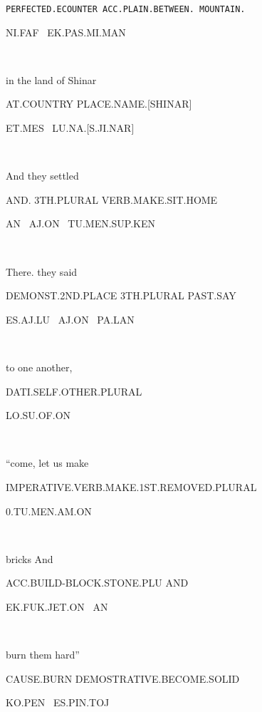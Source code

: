 {{{\tt PERFECTED.ECOUNTER  	ACC.PLAIN.BETWEEN. MOUNTAIN.	}

NI.FAF~                                EK.PAS.MI.MAN 

\Atlanni\faf~\ek\pas\mi\man


\drie  

in the land          of Shinar 

AT.COUNTRY	PLACE.NAME.[SHINAR] 

ET.MES~		LU.NA.[S.JI.NAR] 

\et\mes~\lu\na{}\

\drie


And 	they 		settled			 

AND.	3TH.PLURAL	VERB.MAKE.SIT.HOME	 

AN~	AJ.ON~   TU.MEN.SUP.KEN 

\an~\aj\on~\tu\men\Atlansup\ken

\drie
  

There.			they		said 	 

DEMONST.2ND.PLACE	3TH.PLURAL	PAST.SAY 

ES.AJ.LU~		AJ.ON~		PA.LAN	 

\es\aj\lu~\aj\on~\pa\lan

\drie 

to one another, 			 

DATI.SELF.OTHER.PLURAL		 

LO.SU.OF.ON 

\lo\su\of\on\

\drie 



  

“come, let us make   

IMPERATIVE.VERB.MAKE.1ST.REMOVED.PLURAL 

0.TU.MEN.AM.ON 

\Atlano\tu\men\am\on\

\drie 

 

bricks				And 	 

ACC.BUILD-BLOCK.STONE.PLU 	AND		 

EK.FUK.JET.ON~			AN 

\ek\fuk\jet\on~\an\


  

burn them			hard” 

CAUSE.BURN 			DEMOSTRATIVE.BECOME.SOLID 

KO.PEN~    ES.PIN.TOJ				 

\ko\pen~\es\pin\toj
\drie

}}
